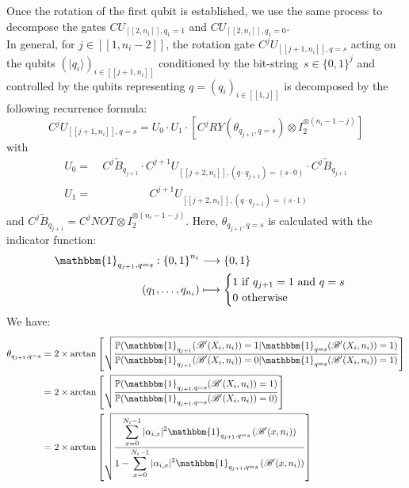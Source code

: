 Once the rotation of the first qubit is established, we use the same process to decompose the gates $CU_{[\![2,n_i]\!],q_1=1}$ and $CU_{[\![2,n_i]\!],q_1=0}$. 
\\[5pt]
In general, for $j\in[\![1,n_i-2]\!]$, the rotation gate $C^jU_{[\![j+1,n_i]\!], q=s}$ acting on the qubits $(|q_i\rangle)_{i\in[\![j+1,n_i]\!]}$ conditioned by the bit-string\footnotemark \ $s \in \{0,1\}^j$ and controlled by the qubits representing $q=(q_i)_{i\in[\![1,j]\!]}$ is decomposed by the following recurrence formula:
\[
C^jU_{[\![j+1,n_i]\!], q=s} = U_0 \cdot U_1 \cdot [C^jRY(\theta_{q_{j+1}, q=s})\otimes I_2^{\otimes (n_i-1-j)}]
\]
with
\begin{align*}
U_0 =&\ C^j\tilde{B}_{q_{j+1}} \cdot C^{j+1}U_{[\![j+2,n_i]\!], (q\cdot q_{j+1})=(s \cdot 0)} \cdot  C^j\tilde{B}_{q_{j+1}}  \\
U_1 =&\ \ \qquad \qquad C^{j+1}U_{[\![j+2,n_i]\!], (q\cdot q_{j+1})=(s\cdot 1)}
\end{align*}
and 
$C^j\tilde{B}_{q_{j+1}} = C^jNOT \otimes I_2^{\otimes (n_i-1-j)}$. 
Here, $\theta_{q_{j+1}, q=s}$ is calculated with the indicator function:
\begin{align*}
    \mathbbm{1}_{q_{j+1}, q=s} : {\{0,1\}}^{n_i} &\longrightarrow \{0,1\} \\
    (q_1, \hdots ,q_{n_i}) &\longmapsto
 \begin{cases}
 1 \ \mathrm{if} \ q_{j+1} = 1 \ \mathrm{and} \ q=s\\
 0 \ \mathrm{otherwise}
 \end{cases}
\end{align*}
We have:
\begin{align*}
    \theta_{q_{j+1}, q=s} =&\ 2\times\mathrm{arctan}\left[\sqrt{\frac{\displaystyle \mathbb{P}(\mathbbm{1}_{q_{j+1}}(\mathscr{B}'(X_i,n_i))=1|\mathbbm{1}_{q=s}(\mathscr{B}'(X_i,n_i))=1)}{\displaystyle \mathbb{P}(\mathbbm{1}_{q_{j+1}}(\mathscr{B}'(X_i,n_i))=0|\mathbbm{1}_{q=s}(\mathscr{B}'(X_i,n_i))=1)}}\right] \\
    =&\ 2\times\mathrm{arctan}\left[\sqrt{\frac{\displaystyle \mathbb{P}(\mathbbm{1}_{q_{j+1}, q=s}(\mathscr{B}'(X_i,n_i))=1)}{\displaystyle \mathbb{P}(\mathbbm{1}_{q_{j+1}, q=s}(\mathscr{B}'(X_i,n_i))=0)}}\right] \\
    =&\ 2\times\mathrm{arctan}\left[\sqrt{\frac{\displaystyle \sum_{x=0}^{N_i-1}|\alpha_{i,x}|^2\mathbbm{1}_{q_{j+1}, q=s}\left(\mathscr{B}'(x,n_i)\right)}{\displaystyle 1-\sum_{x=0}^{N_i-1}|\alpha_{i,x}|^2\mathbbm{1}_{q_{j+1}, q=s}\left(\mathscr{B}'(x,n_i)\right)}}\right]
\end{align*}
